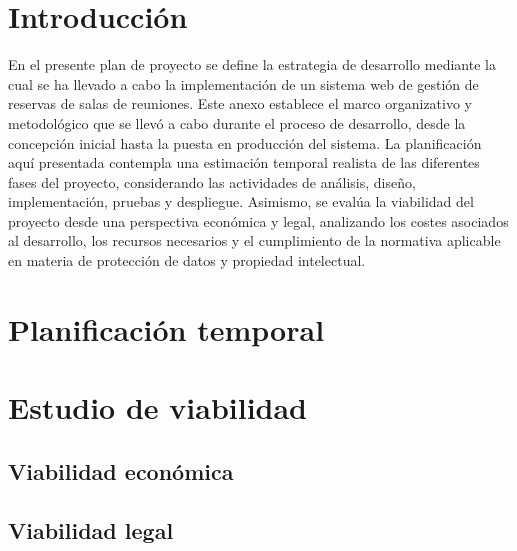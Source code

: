 
\section{Introducción}
En el presente plan de proyecto se define la estrategia de desarrollo mediante la cual se ha llevado a cabo la implementación de un sistema web de gestión de reservas de salas de reuniones. Este anexo establece el marco organizativo y metodológico que se llevó a cabo durante el proceso de desarrollo, desde la concepción inicial hasta la puesta en producción del sistema. La planificación aquí presentada contempla una estimación temporal realista de las diferentes fases del proyecto, considerando las actividades de análisis, diseño, implementación, pruebas y despliegue. Asimismo, se evalúa la viabilidad del proyecto desde una perspectiva económica y legal, analizando los costes asociados al desarrollo, los recursos necesarios y el cumplimiento de la normativa aplicable en materia de protección de datos y propiedad intelectual.

\section{Planificación temporal}

\section{Estudio de viabilidad}

\subsection{Viabilidad económica}

\subsection{Viabilidad legal}


